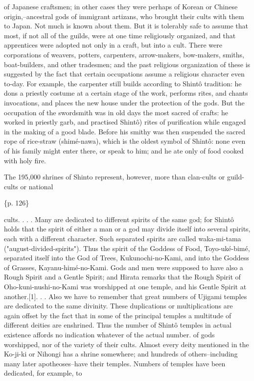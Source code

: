 of Japanese craftsmen; in other cases they were perhaps of Korean or Chinese origin,--ancestral gods of immigrant artizans, who brought their cults with them to Japan. Not much is known about them. But it is tolerably safe to assume that most, if not all of the guilds, were at one time religiously organized, and that apprentices were adopted not only in a craft, but into a cult. There were corporations of weavers, potters, carpenters, arrow-makers, bow-makers, smiths, boat-builders, and other tradesmen; and the past religious organization of these is suggested by the fact that certain occupations assume a religious character even to-day. For example, the carpenter still builds according to Shintô tradition: he dons a priestly costume at a certain stage of the work, performs rites, and chants invocations, and places the new house under the protection of the gods. But the occupation of the swordsmith was in old days the most sacred of crafts: he worked in priestly garb, and practised Shintô) rites of purification while engaged in the making of a good blade. Before his smithy was then suspended the sacred rope of rice-straw (shimé-nawa), which is the oldest symbol of Shintô: none even of his family might enter there, or speak to him; and he ate only of food cooked with holy fire.



The 195,000 shrines of Shinto represent, however, more than clan-cults or guild-cults or national

\{p. 126\}

cults. . . . Many are dedicated to different spirits of the same god; for Shintô holds that the spirit of either a man or a god may divide itself into several spirits, each with a different character. Such separated spirits are called waka-mi-tama ("august-divided-spirits"). Thus the spirit of the Goddess of Food, Toyo-uké-bimé, separated itself into the God of Trees, Kukunochi-no-Kami, and into the Goddess of Grasses, Kayanu-himé-no-Kami. Gods and men were supposed to have also a Rough Spirit and a Gentle Spirit; and Hirata remarks that the Rough Spirit of Oho-kuni-nushi-no-Kami was worshipped at one temple, and his Gentle Spirit at another.[1]. . . Also we have to remember that great numbers of Ujigami temples are dedicated to the same divinity. These duplications or multiplications are again offset by the fact that in some of the principal temples a multitude of different deities are enshrined. Thus the number of Shintô temples in actual existence affords no indication whatever of the actual number. of gods worshipped, nor of the variety of their cults. Almost every deity mentioned in the Ko-ji-ki or Nihongi has a shrine somewhere; and hundreds of others--including many later apotheoses--have their temples. Numbers of temples have been dedicated, for example, to

